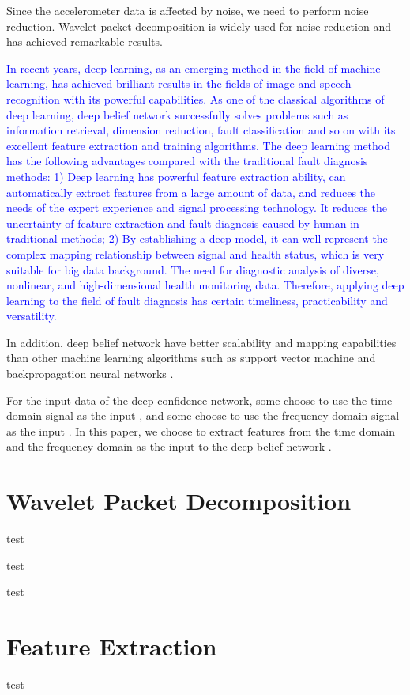 \documentclass{modified}
\begin{document}
Since the accelerometer data is affected by noise, we need to perform noise reduction. Wavelet packet decomposition \cite{Wang2015Detection}\cite{Yongle2015Zero} is widely used for noise reduction and has achieved remarkable results.


\textcolor{blue}{In recent years, deep learning, as an emerging method in the field of machine learning, has achieved brilliant results in the fields of image and speech recognition with its powerful capabilities. As one of the classical algorithms of deep learning, deep belief network \cite{Hinton2012A} successfully solves problems such as information retrieval, dimension reduction, fault classification and so on with its excellent feature extraction and training algorithms. The deep learning method has the following advantages compared with the traditional fault diagnosis methods: 1) Deep learning has powerful feature extraction ability, can automatically extract features from a large amount of data, and reduces the needs of the expert experience and signal processing technology. It reduces the uncertainty of feature extraction and fault diagnosis caused by human in traditional methods; 2) By establishing a deep model, it can well represent the complex mapping relationship between signal and health status, which is very suitable for big data background. The need for diagnostic analysis of diverse, nonlinear, and high-dimensional health monitoring data. Therefore, applying deep learning to the field of fault diagnosis has certain timeliness, practicability and versatility.}

In addition, deep belief network have better scalability and mapping capabilities than other machine learning algorithms such as support vector machine \cite{vapnik1999overview} and backpropagation neural networks \cite{Kramer1990Diagnosis}.

For the input data of the deep confidence network, some choose to use the time domain signal as the input \cite{guangquan2016fault}, and some choose to use the frequency domain signal as the input \cite{jia2016deep}. In this paper, we choose to extract features from the time domain and the frequency domain as the input to the deep belief network \cite{YiThe}.

\section{Wavelet Packet Decomposition}
test

test

test
\section{Feature Extraction}
test
\end{document}
